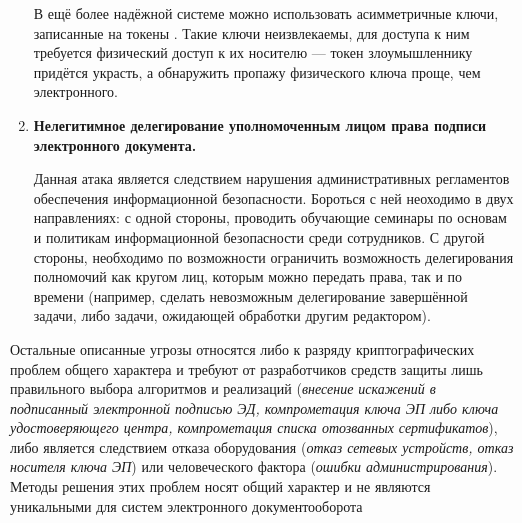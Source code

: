 \begin{enumerate}
	\vspace{\baselineskip}
	В ещё более надёжной системе можно использовать асимметричные ключи, записанные на токены \cite{gpghowto, rutoken}. Такие ключи неизвлекаемы, для доступа к ним требуется физический доступ к их носителю --- токен злоумышленнику придётся украсть, а обнаружить пропажу физического ключа проще, чем электронного.

	\item \textbf{Нелегитимное делегирование уполномоченным лицом права подписи электронного документа.}

	Данная атака является следствием нарушения административных регламентов обеспечения информационной безопасности. Бороться с ней неоходимо в двух направлениях: с одной стороны, проводить обучающие семинары по основам и политикам информационной безопасности среди сотрудников. С другой стороны, необходимо по возможности ограничить возможность делегирования полномочий как кругом лиц, которым можно передать права, так и по времени (например, сделать невозможным делегирование завершённой задачи, либо задачи, ожидающей обработки другим редактором).
\end{enumerate}

\vspace{\baselineskip}
Остальные описанные угрозы относятся либо к разряду криптографических проблем общего характера и требуют от разработчиков средств защиты лишь правильного выбора алгоритмов и реализаций (\textit{внесение искажений в подписанный электронной подписью ЭД, компрометация ключа ЭП либо ключа удостоверяющего центра, компрометация списка отозванных сертификатов}), либо является следствием отказа оборудования (\textit{отказ сетевых устройств, отказ носителя ключа ЭП}) или человеческого фактора (\textit{ошибки администрирования}). Методы решения этих проблем носят общий характер и не являются уникальными для систем электронного документооборота 